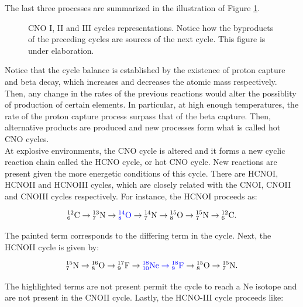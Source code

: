 \documentclass[openany]{book}
\begin{document}
The last three processes are summarized in the illustration of Figure \ref{fig:CNOcyles}.

\begin{figure}[H]
	
	\caption[CNO I, II and III cycles representations]{CNO I, II and III cycles representations. Notice how the byproducts of the preceding cycles are sources of the next cycle. This figure is under elaboration.}
	\label{fig:CNOcyles}
\end{figure}

Notice that the cycle balance is established by the existence of proton capture and beta decay, which increases and decreases the atomic mass respectively. Then, any change in the rates of the previous reactions would alter the possiblity of production of certain elements. In particular, at high enough temperatures, the rate of the proton capture process surpass that of the beta capture. Then, alternative products are produced and new processes form what is called hot CNO cycles. \\ 

At explosive environments, the CNO cycle is altered and it forms a new cyclic reaction chain called the HCNO cycle, or hot CNO cycle.  New reactions are present given the more energetic conditions of this cycle. There are HCNOI, HCNOII and HCNOIII cycles, which are closely related with the CNOI, CNOII and CNOIII cycles respectively. For instance, the HCNOI proceeds as: 

\begin{equation} \label{eq:reaction_HCNO_C}
	\mathrm{{}_{6}^{12}C  \rightarrow {}^{13}_{7}N  \rightarrow \textcolor{blue}{{}^{14}_{8}O}  \rightarrow {}^{14}_{7}N  \rightarrow {}^{15}_{8}O  \rightarrow {}^{15}_{7}N \rightarrow {}^{12}_{6}C}.
\end{equation}

The painted term corresponds to the differing term in the cycle. Next, the HCNOII cycle is given by: 

\begin{equation} \label{eq:reaction_HCNO_N}
	\mathrm{{}_{7}^{15}N  \rightarrow {}^{16}_{8}O  \rightarrow {}^{17}_{9}F  \rightarrow \textcolor{blue}{{}^{18}_{10}Ne  \rightarrow {}^{18}_{9}F}  \rightarrow {}^{15}_{8}O \rightarrow {}^{15}_{7}N  }.
\end{equation}

The highlighted terms are not present permit the cycle to reach a Ne isotope and are not present in the CNOII cycle. Lastly, the HCNO-III cycle proceeds like: 
\end{document}
